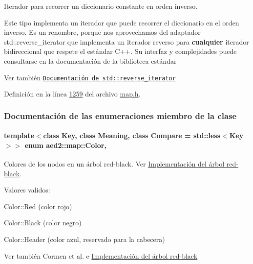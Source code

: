 Iterador para recorrer un diccionario constante en orden inverso. 

Este tipo implementa un iterador que puede recorrer el diccionario en el orden inverso. Es un renombre, porque nos aprovechamos del adaptador {\ttfamily std\+::reverse\+\_\+iterator} que implementa un iterador reverso para {\bfseries cualquier} iterador bidireccional que respete el estándar C++. Su interfaz y complejidades puede consultarse en la documentación de la biblioteca estándar

\begin{DoxySeeAlso}{Ver también}
\href{http://en.cppreference.com/w/cpp/iterator/reverse_iterator}{\tt Documentación de {\ttfamily std\+::reverse\+\_\+iterator}} 
\end{DoxySeeAlso}


Definición en la línea \hyperlink{map_8h_source_l01259}{1259} del archivo \hyperlink{map_8h_source}{map.\+h}.



\subsubsection{Documentación de las enumeraciones miembro de la clase}
\paragraph[{\texorpdfstring{Color}{Color}}]{\setlength{\rightskip}{0pt plus 5cm}template$<$class Key, class Meaning, class Compare = std\+::less$<$\+Key$>$$>$ enum {\bf aed2\+::map\+::\+Color}\hspace{0.3cm}{\ttfamily [strong]}, {\ttfamily [private]}}\hypertarget{classaed2_1_1map_a6d62a415a4b9d320b30cada4ebcf9f5b_a6d62a415a4b9d320b30cada4ebcf9f5b}{}\label{classaed2_1_1map_a6d62a415a4b9d320b30cada4ebcf9f5b_a6d62a415a4b9d320b30cada4ebcf9f5b}


Colores de los nodos en un árbol red-\/black. Ver \hyperlink{Implementacion}{Implementación del árbol red-\/black}. 

Valores validos\+: \begin{DoxyItemize}
\item Color\+::\+Red (color rojo) \item Color\+::\+Black (color negro) \item Color\+::\+Header (color azul, reservado para la cabecera)\end{DoxyItemize}
\begin{DoxySeeAlso}{Ver también}
Cormen et al. \cite{CormenLeisersonRivestStein2009} e \hyperlink{Implementacion}{Implementación del árbol red-\/black} 
\end{DoxySeeAlso}


